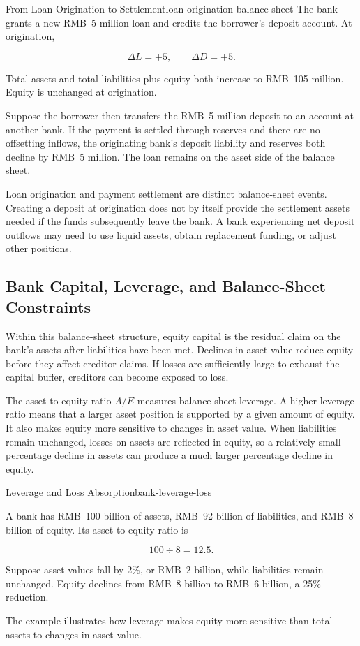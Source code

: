 \begin{example}{From Loan Origination to Settlement}{loan-origination-balance-sheet}
The bank grants a new RMB~5 million loan and credits the borrower's deposit account. At origination,

\[
\Delta L=+5,
\qquad
\Delta D=+5.
\]

Total assets and total liabilities plus equity both increase to RMB~105 million. Equity is unchanged at origination.

Suppose the borrower then transfers the RMB~5 million deposit to an account at another bank. If the payment is settled through reserves and there are no offsetting inflows, the originating bank's deposit liability and reserves both decline by RMB~5 million. The loan remains on the asset side of the balance sheet.

\end{example}

Loan origination and payment settlement are distinct balance-sheet events. Creating a deposit at origination does not by itself provide the settlement assets needed if the funds subsequently leave the bank. A bank experiencing net deposit outflows may need to use liquid assets, obtain replacement funding, or adjust other positions.

\subsection{Bank Capital, Leverage, and Balance-Sheet Constraints}

Within this balance-sheet structure, equity capital is the residual claim on the bank's assets after liabilities have been met. Declines in asset value reduce equity before they affect creditor claims. If losses are sufficiently large to exhaust the capital buffer, creditors can become exposed to loss.

The asset-to-equity ratio $A/E$ measures balance-sheet leverage. A higher leverage ratio means that a larger asset position is supported by a given amount of equity. It also makes equity more sensitive to changes in asset value. When liabilities remain unchanged, losses on assets are reflected in equity, so a relatively small percentage decline in assets can produce a much larger percentage decline in equity.

\begin{example}{Leverage and Loss Absorption}{bank-leverage-loss}

A bank has RMB~100 billion of assets, RMB~92 billion of liabilities, and RMB~8 billion of equity. Its asset-to-equity ratio is

\[
100\div 8=12.5.
\]

Suppose asset values fall by 2\%, or RMB~2 billion, while liabilities remain unchanged. Equity declines from RMB~8 billion to RMB~6 billion, a 25\% reduction.

The example illustrates how leverage makes equity more sensitive than total assets to changes in asset value.

\end{example}

